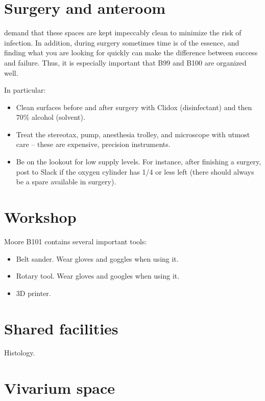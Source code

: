 \documentclass{tufte-book}
\begin{document}
\section{Surgery and anteroom}

 demand that these
spaces are kept impeccably clean to minimize the risk of infection. In
addition, during surgery sometimes time is of the essence, and finding
what you are looking for quickly can make the difference between
success and failure. Thus, it is especially important that B99 and
B100 are organized well.

In particular:

\begin{itemize}
\item{Clean surfaces before and after surgery with Clidox
  (disinfectant) and then 70\% alcohol (solvent).}
\item{Treat the stereotax, pump, anesthesia trolley, and microscope
  with utmost care -- these are expensive, precision instruments.}
\item{Be on the lookout for low supply levels. For instance, after
  finishing a surgery, post to Slack if the oxygen cylinder has 1/4 or
  less left (there should always be a spare available in surgery).}
\end{itemize}

\section{Workshop}

Moore B101 contains several important tools:

\begin{itemize}
\item{Belt sander. Wear gloves and goggles when using it.}
\item{Rotary tool. Wear gloves and googles when using it.}
\item{3D printer.}
\end{itemize}

\section{Shared facilities}

Histology.

\section{Vivarium space}
\end{document}
